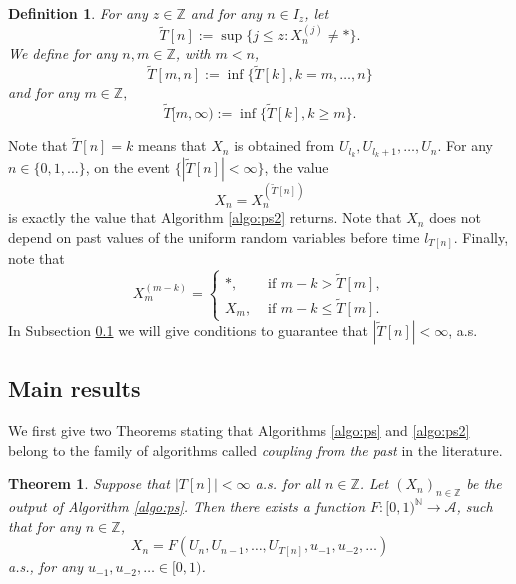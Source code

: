 \documentclass[a4paper]{article}
\newtheorem{theorem}{Theorem}%
\newtheorem{definition}{Definition}%
\newcommand{\Z}{\mathbb{Z}}
\newcommand{\N}{\mathbb{N}}
\newcommand{\A}{\mathcal{A}}
\newcommand{\mydef}{:=}
\begin{document}
\begin{definition}\label{def:Ttilde}
For any $z \in \Z$ and for any $n\in I_z$, let
\begin{equation}\label{eq:Tntilde}
\tilde{T}[n]:=\sup\{j\leq z: X_n^{(j)}\neq *\}.
\end{equation}
We define for any $n,m\in \Z$, with $m<n$,
$$
\tilde{T}[m,n]\mydef\inf\{\tilde{T}[k],k=m,\ldots,n\}
$$
and for any $ m \in \Z,$
$$
\tilde{T}[m, \infty)  \mydef\inf\{\tilde{T}[k],k \geq m \}.
$$
\end{definition}

Note that $\tilde{T}[n]=k$ means that $X_n$ is obtained from $U_{l_k},U_{l_k+1}, \ldots, U_n$.
For any $n\in \{0,1,\ldots\}$, on the event $\{|\tilde{T}[n]|<\infty\}$, the value
\begin{equation}
X_n=X_n^{(\tilde{T}[n])}
\end{equation}
is exactly the value that Algorithm \ref{algo:ps2} returns. Note that $X_n$ does not depend on past values of the uniform random variables before time $l_{T[n]}$. %
Finally, note that
$$
X_{m}^{(m-k)}=
\begin{cases}
*, &\text{ if } m-k>\tilde{T}[m],\\
X_m, &\text{ if } m-k\leq \tilde{T}[m].
\end{cases}
$$ 
In Subsection \ref{sec:results} we will give conditions to guarantee that $|\tilde{T}[n]|<\infty$, a.s.


\subsection{Main results} \label{sec:results}

We first give two Theorems stating that Algorithms \ref{algo:ps} and \ref{algo:ps2} belong to the family of algorithms called {\it coupling from the past} in the literature. 

\begin{theorem} \label{teo:cftp}
Suppose that $|T[n]|<\infty$ a.s. for all $n\in \Z$.
Let $(X_n)_{n\in \Z}$ be the output of Algorithm \ref{algo:ps}. Then there exists a function
$F:[0,1)^{\N} \to \A$,
such that for any $n\in \Z$,
$$
X_n=F(U_n,U_{n-1}, \ldots, U_{T[n]}, u_{-1},u_{-2},\ldots)
$$
a.s., for any $u_{-1},u_{-2},\ldots \in [0,1)$. 
\end{theorem}
\end{document}
